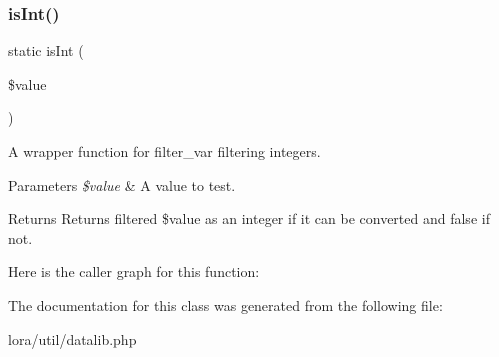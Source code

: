 \subsubsection{\texorpdfstring{is\+Int()}{isInt()}}
{\footnotesize\ttfamily static is\+Int (\begin{DoxyParamCaption}\item[{}]{\$value }\end{DoxyParamCaption})\hspace{0.3cm}{\ttfamily [static]}}

A wrapper function for filter\+\_\+var filtering integers. 
\begin{DoxyParams}{Parameters}
{\em \$value} & A value to test. \\
\hline
\end{DoxyParams}
\begin{DoxyReturn}{Returns}
Returns filtered \$value as an integer if it can be converted and false if not. 
\end{DoxyReturn}

Here is the caller graph for this function\+:


The documentation for this class was generated from the following file\+:\begin{DoxyCompactItemize}
\item 
lora/util/datalib.\+php\end{DoxyCompactItemize}
